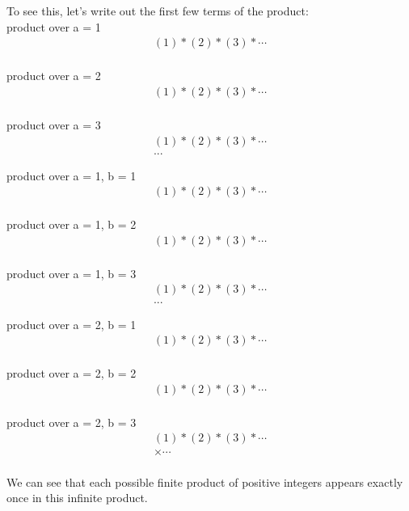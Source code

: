 \documentclass{article}
\begin{document}
To see this, let's write out the first few terms of the product: \\

product over a = 1 
\begin{align*}
(1) * (2) * (3) * \cdots \\
\end{align*}

product over a = 2
\begin{align*}
(1) * (2) * (3) * \cdots \\
\end{align*}

product over a = 3 
\begin{align*}
(1) * (2) * (3) * \cdots \\
...
\end{align*}

product over a = 1, b = 1
\begin{align*}
(1) * (2) * (3) * \cdots \\
\end{align*}

product over a = 1, b = 2 \\
\begin{align*}
(1) * (2) * (3) * \cdots \\
\end{align*}

product over a = 1, b = 3 
\begin{align*}
(1) * (2) * (3) * \cdots \\
...
\end{align*}

product over a = 2, b = 1 
\begin{align*}
(1) * (2) * (3) * \cdots \\
\end{align*}

product over a = 2, b = 2
\begin{align*}
(1) * (2) * (3) * \cdots \\
\end{align*}

product over a = 2, b = 3 
\begin{align*}
(1) * (2) * (3) * \cdots \\
\times \cdots \\
\end{align*}

We can see that each possible finite product of positive integers appears exactly once in this infinite product. \\
\end{document}
